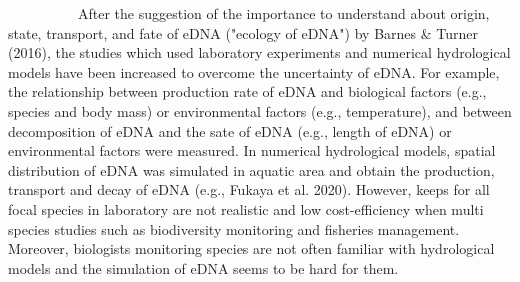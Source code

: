 \documentclass[12pt]{article}
\begin{document}
\begin{linenumbers}
\ \ \ \ \ \ \ \ \ \ 
After the suggestion of the importance to understand about origin, state, transport, and fate of eDNA ("ecology of eDNA") by Barnes \& Turner (2016), the studies which used laboratory experiments and numerical hydrological models have been increased to overcome the uncertainty of eDNA. 
For example, the relationship between production rate of eDNA and biological factors (e.g., species and body mass) or environmental factors (e.g., temperature), and between decomposition of eDNA and the sate of eDNA (e.g., length of eDNA) or environmental factors were measured. In numerical hydrological models, spatial distribution of eDNA was simulated in aquatic area and obtain the production, transport and decay of eDNA (e.g., Fukaya et al. 2020). %
However, keeps for all focal species in laboratory are not realistic and low cost-efficiency when multi species studies such as biodiversity monitoring and fisheries management. Moreover, biologists monitoring species are not often familiar with hydrological models and the simulation of eDNA seems to be hard for them.


\end{linenumbers}
\end{document}
